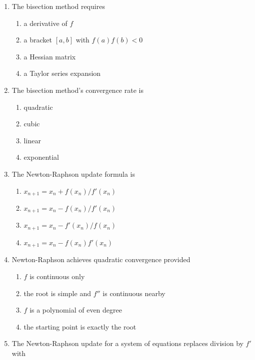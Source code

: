 \documentclass[
]{article}
\providecommand{\tightlist}{%
  \setlength{\itemsep}{0pt}\setlength{\parskip}{0pt}}
\begin{document}
\begin{enumerate}
\def\labelenumi{\arabic{enumi}.}
\tightlist
\item
  The bisection method requires

  \begin{enumerate}
  \def\labelenumii{(\alph{enumii})}
  \tightlist
  \item
    a derivative of \(f\)
  \item
    a bracket \([a,b]\) with \(f(a)f(b)<0\)
  \item
    a Hessian matrix
  \item
    a Taylor series expansion
  \end{enumerate}
\item
  The bisection method's convergence rate is

  \begin{enumerate}
  \def\labelenumii{(\alph{enumii})}
  \tightlist
  \item
    quadratic
  \item
    cubic
  \item
    linear
  \item
    exponential
  \end{enumerate}
\item
  The Newton-Raphson update formula is

  \begin{enumerate}
  \def\labelenumii{(\alph{enumii})}
  \tightlist
  \item
    \(x_{n+1}=x_n+f(x_n)/f'(x_n)\)
  \item
    \(x_{n+1}=x_n-f(x_n)/f'(x_n)\)
  \item
    \(x_{n+1}=x_n-f'(x_n)/f(x_n)\)
  \item
    \(x_{n+1}=x_n-f(x_n)f'(x_n)\)
  \end{enumerate}
\item
  Newton-Raphson achieves quadratic convergence provided

  \begin{enumerate}
  \def\labelenumii{(\alph{enumii})}
  \tightlist
  \item
    \(f\) is continuous only
  \item
    the root is simple and \(f''\) is continuous nearby
  \item
    \(f\) is a polynomial of even degree
  \item
    the starting point is exactly the root
  \end{enumerate}
\item
  The Newton-Raphson update for a system of equations replaces division
  by \(f'\) with


\end{enumerate}
\end{document}
